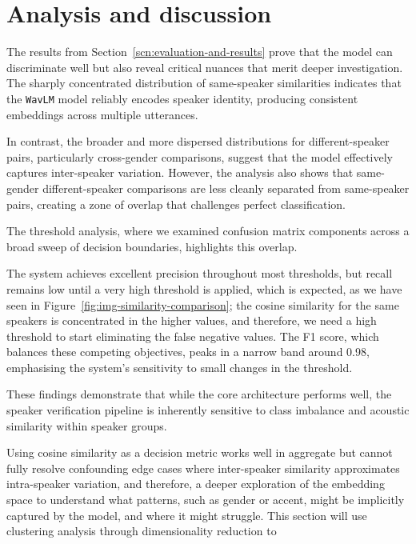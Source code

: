 \documentclass[conference]{IEEEtran}
\begin{document}
	\section{Analysis and discussion}
	
	The results from Section~\ref{scn:evaluation-and-results} prove that the model can discriminate well but also reveal critical nuances that merit deeper investigation. The sharply concentrated distribution of same-speaker similarities indicates that the \texttt{WavLM} model reliably encodes speaker identity, producing consistent embeddings across multiple utterances.
	
	In contrast, the broader and more dispersed distributions for different-speaker pairs, particularly cross-gender comparisons, suggest that the model effectively captures inter-speaker variation. However, the analysis also shows that same-gender different-speaker comparisons are less cleanly separated from same-speaker pairs, creating a zone of overlap that challenges perfect classification.
	
	The threshold analysis, where we examined confusion matrix components across a broad sweep of decision boundaries, highlights this overlap. 
	
	
	The system achieves excellent precision throughout most thresholds, but recall remains low until a very high threshold is applied, which is expected, as we have seen in Figure~\ref{fig:img-similarity-comparison}; the cosine similarity for the same speakers is concentrated in the higher values, and therefore, we need a high threshold to start eliminating the false negative values. The F1 score, which balances these competing objectives, peaks in a narrow band around 0.98, emphasising the system's sensitivity to small changes in the threshold.
	
	These findings demonstrate that while the core architecture performs well, the speaker verification pipeline is inherently sensitive to class imbalance and acoustic similarity within speaker groups. 
	
	Using cosine similarity as a decision metric works well in aggregate but cannot fully resolve confounding edge cases where inter-speaker similarity approximates intra-speaker variation, and therefore, a deeper exploration of the embedding space to understand what patterns, such as gender or accent, might be implicitly captured by the model, and where it might struggle. This section will use clustering analysis through dimensionality reduction to 
	
\end{document}
